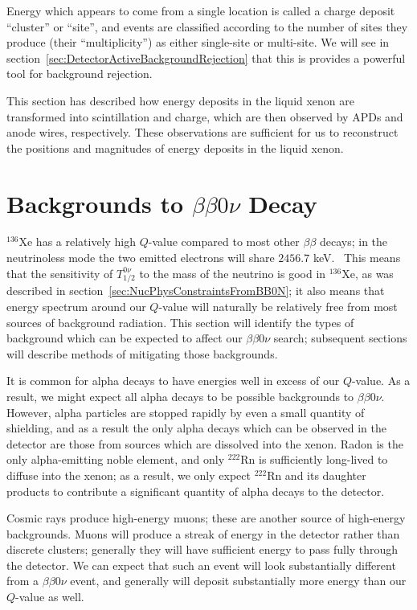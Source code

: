 Energy which appears to come from a single location is called a charge deposit ``cluster'' or ``site'', and events are classified according to the number of sites they produce (their ``multiplicity'') as either single-site or multi-site.  We will see in section~\ref{sec:DetectorActiveBackgroundRejection} that this is provides a powerful tool for background rejection.

This section has described how energy deposits in the liquid xenon are transformed into scintillation and charge, which are then observed by APDs and anode wires, respectively.  These observations are sufficient for us to reconstruct the positions and magnitudes of energy deposits in the liquid xenon.

\section{Backgrounds to \texorpdfstring{$\beta\beta 0\nu$}{Neutrinoless Double-Beta} Decay}\label{sec:DetectorBackgrounds}

$^{136}$Xe has a relatively high $Q$-value compared to most other $\beta\beta$ decays; in the neutrinoless mode the two emitted electrons will share $2456.7$ keV.~\cite{NewEXObb0nPaper_2014}  This means that the sensitivity of $T_{1/2}^{0\nu}$ to the mass of the neutrino is good in $^{136}$Xe, as was described in section~\ref{sec:NucPhysConstraintsFromBB0N}; it also means that energy spectrum around our $Q$-value will naturally be relatively free from most sources of background radiation.  This section will identify the types of background which can be expected to affect our $\beta\beta 0\nu$ search; subsequent sections will describe methods of mitigating those backgrounds.

It is common for alpha decays to have energies well in excess of our $Q$-value.  As a result, we might expect all alpha decays to be possible backgrounds to $\beta\beta 0\nu$.  However, alpha particles are stopped rapidly by even a small quantity of shielding, and as a result the only alpha decays which can be observed in the detector are those from sources which are dissolved into the xenon.  Radon is the only alpha-emitting noble element, and only $^{222}$Rn is sufficiently long-lived to diffuse into the xenon; as a result, we only expect $^{222}$Rn and its daughter products to contribute a significant quantity of alpha decays to the detector.

Cosmic rays produce high-energy muons; these are another source of high-energy backgrounds.  Muons will produce a streak of energy in the detector rather than discrete clusters; generally they will have sufficient energy to pass fully through the detector.  We can expect that such an event will look substantially different from a $\beta\beta 0\nu$ event, and generally will deposit substantially more energy than our $Q$-value as well.

